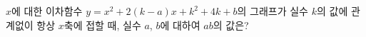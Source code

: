 $x$에 대한 이차함수 $y=x^2+2(k-a)x+k^2+4k+b$의 그래프가 실수 $k$의 값에 관계없이 항상 $x$축에 접할 때, 실수 $a$, $b$에 대하여 $ab$의 값은?
